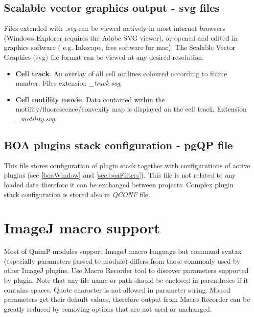 \documentclass[a4paper,12pt]{article}
\begin{document}
\subsection{Scalable vector graphics output - svg files}

Files extended with
\textit{.svg} can be viewed natively in most internet browsers (Windows Explorer requires the Adobe SVG viewer), or opened and edited
in graphics software ( e.g. Inkscape, free software for mac).  The 
Scalable Vector Graphics (svg) file format can be viewed at any desired resolution. 

\begin{itemize}

\item \textbf{Cell track}.  An overlay of all cell outlines coloured according to frame number. Files extension \textit{\_track.svg}.

\item \textbf{Cell motility movie}.  Data contained within the motility/fluorescence/convexity map is displayed on the cell track. Extension \textit{\_motility.svg}.

\end{itemize}

\subsection{BOA plugins stack configuration - pgQP file}

This file stores configuration of plugin stack together with configurations of active plugins (see \autoref{boaWindow} and \autoref{sec:boaFilters}). This file is not related to any loaded data therefore it can be exchanged between projects. Complex plugin stack configuration is stored also in \textit{QCONF} file. 



\section{ImageJ macro support}
\label{sec:macrosupport}
Most of QuimP modules support ImageJ macro language but command syntax (especially parameters passed to module)  differs from those commonly used by other ImageJ plugins. Use Macro Recorder tool to discover parameters supported by plugin. Note that any file name or path should be enclosed in parentheses if it contains spaces. Quote character is not allowed in parameter string. Missed parameters get their default values, therefore output from Macro Recorder can be greatly reduced by removing options that are not used or unchanged. 
\end{document}
